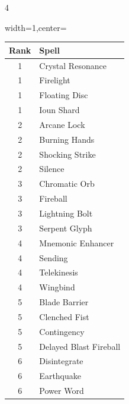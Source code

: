 \documentclass{book}
\begin{document}
\begin{multicols}{4}
\begin{table}[H]
	\begin{adjustbox}{width=1\columnwidth,center=\columnwidth}
		\begin{tabular}{cl}
			\toprule
			Rank & Spell \\
			\midrule
			1 & Crystal Resonance \\
			1 & Firelight \\
			1 & Floating Disc \\
			1 & Ioun Shard \\
			2 & Arcane Lock \\
			2 & Burning Hands \\
			2 & Shocking Strike \\
			2 & Silence \\
			3 & Chromatic Orb \\
			3 & Fireball \\
			3 & Lightning Bolt \\
			3 & Serpent Glyph \\
			4 & Mnemonic Enhancer \\
			4 & Sending \\
			4 & Telekinesis \\
			4 & Wingbind \\
			5 & Blade Barrier \\
			5 & Clenched Fist \\
			5 & Contingency \\
			5 & Delayed Blast Fireball \\
			6 & Disintegrate \\
			6 & Earthquake \\
			6 & Power Word \\
			\bottomrule
		\end{tabular}
	\end{adjustbox}
\end{table}


\end{multicols}
\end{document}
